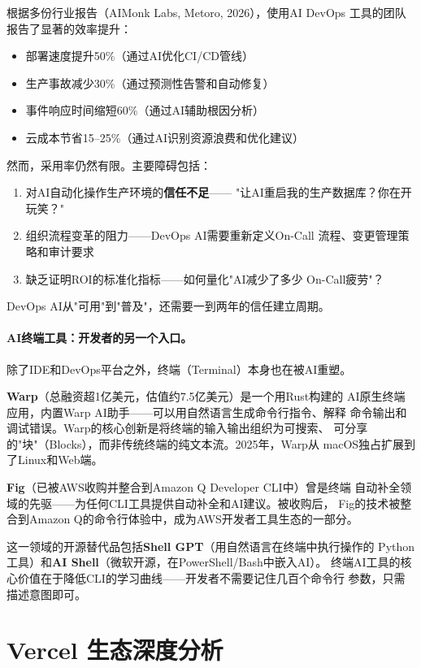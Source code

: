 \begin{corebox}[AI DevOps工具的采用现状与挑战]
根据多份行业报告（AIMonk Labs, Metoro, 2026），使用AI DevOps
工具的团队报告了显著的效率提升：
\begin{itemize}
  \item 部署速度提升50\%（通过AI优化CI/CD管线）
  \item 生产事故减少30\%（通过预测性告警和自动修复）
  \item 事件响应时间缩短60\%（通过AI辅助根因分析）
  \item 云成本节省15--25\%（通过AI识别资源浪费和优化建议）
\end{itemize}
然而，采用率仍然有限。主要障碍包括：
\begin{enumerate}
  \item 对AI自动化操作生产环境的\textbf{信任不足}——
    "让AI重启我的生产数据库？你在开玩笑？"
  \item 组织流程变革的阻力——DevOps AI需要重新定义On-Call
    流程、变更管理策略和审计要求
  \item 缺乏证明ROI的标准化指标——如何量化"AI减少了多少
    On-Call疲劳"？
\end{enumerate}
DevOps AI从"可用"到"普及"，还需要一到两年的信任建立周期。
\end{corebox}

\paragraph{AI终端工具：开发者的另一个入口。}
除了IDE和DevOps平台之外，终端（Terminal）本身也在被AI重塑。

\textbf{Warp}（总融资超1亿美元，估值约7.5亿美元）是一个用Rust构建的
AI原生终端应用，内置Warp AI助手——可以用自然语言生成命令行指令、解释
命令输出和调试错误。Warp的核心创新是将终端的输入输出组织为可搜索、
可分享的"块"（Blocks），而非传统终端的纯文本流。2025年，Warp从
macOS独占扩展到了Linux和Web端。

\textbf{Fig}（已被AWS收购并整合到Amazon Q Developer CLI中）曾是终端
自动补全领域的先驱——为任何CLI工具提供自动补全和AI建议。被收购后，
Fig的技术被整合到Amazon Q的命令行体验中，成为AWS开发者工具生态的一部分。

这一领域的开源替代品包括\textbf{Shell GPT}（用自然语言在终端中执行操作的
Python工具）和\textbf{AI Shell}（微软开源，在PowerShell/Bash中嵌入AI）。
终端AI工具的核心价值在于降低CLI的学习曲线——开发者不需要记住几百个命令行
参数，只需描述意图即可。


\section{Vercel 生态深度分析}
\label{sec:devtools-vercel}

